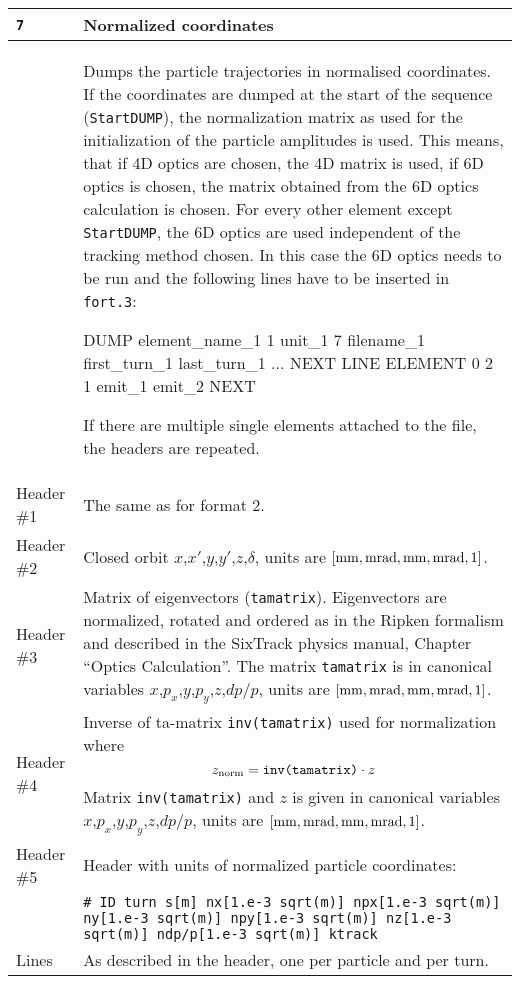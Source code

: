 \begin{center}
\begin{longtable}{|p{1.8cm}|p{13.8cm}|}
        \rowcolor{blue!15}
        \texttt{7} & Normalized coordinates\\
        \hline
        & Dumps the particle trajectories in normalised coordinates. If the coordinates are dumped at the start of the sequence (\texttt{StartDUMP}), the normalization matrix as used for the initialization of the particle amplitudes is used. This means, that if 4D optics are chosen, the 4D matrix is used, if 6D optics is chosen, the matrix obtained from the 6D optics calculation is chosen. For every other element except \texttt{StartDUMP}, the 6D optics are used independent of the tracking method chosen. In this case the 6D optics needs to be run and the following lines have to be inserted in \texttt{fort.3}:
            \bigskip
            \begin{cverbatim}
DUMP
element_name_1 1 unit_1 7 filename_1 first_turn_1 last_turn_1
...
NEXT
LINE
ELEMENT  0 2 1 emit_1 emit_2
NEXT
            \end{cverbatim}
            \bigskip
            If there are multiple single elements attached to the file, the headers are repeated.\\
            \hline
            Header \#1 & The same as for format 2.\\
            \hline
            Header \#2 & Closed orbit  $x$,$x'$,$y$,$y'$,$z$,$\delta$, units are $[\rm mm,mrad,mm,mrad,1]$.\\
            \hline
            Header \#3 & Matrix of eigenvectors (\texttt{tamatrix}). Eigenvectors are normalized, rotated and ordered as in the Ripken formalism and described in the SixTrack physics manual, Chapter ``Optics Calculation''. The matrix \texttt{tamatrix} is in canonical variables $x$,$p_x$,$y$,$p_y$,$z$,$dp/p$, units are $[\rm mm,mrad,mm,mrad,1]$. \\
            \hline
            Header \#4 & Inverse of ta-matrix \texttt{inv(tamatrix)} used for normalization where \begin{equation}
                z_{\rm norm}=\texttt{inv(tamatrix)}\cdot z
            \end{equation}
            Matrix \texttt{inv(tamatrix)} and $z$ is given in canonical variables $x$,$p_x$,$y$,$p_y$,$z$,$dp/p$, units are $[\rm mm,mrad,mm,mrad,1]$.\\
            \hline
            Header \#5 & Header with units of normalized particle coordinates:\\
                       & \texttt{\# ID turn s[m] nx[1.e-3 sqrt(m)] npx[1.e-3 sqrt(m)] ny[1.e-3 sqrt(m)] npy[1.e-3 sqrt(m)] nz[1.e-3 sqrt(m)] ndp/p[1.e-3 sqrt(m)] ktrack} \\
            \hline
            Lines      & As described in the header, one per particle and per turn.\\
            \hline


\end{longtable}
\end{center}
